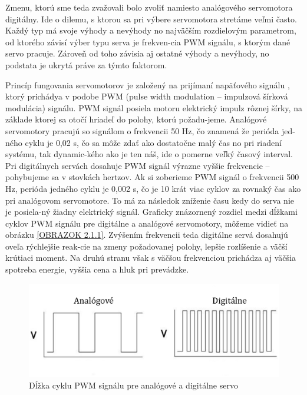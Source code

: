Zmenu, ktorú sme teda zvažovali bolo zvoliť namiesto analógového servomotora digitálny. Ide o dilemu, s ktorou sa pri výbere servomotora stretáme veľmi často. Každý typ má svoje výhody a nevýhody no najväčším rozdielovým parametrom, od ktorého závisí výber typu serva je frekven-cia PWM signálu, s ktorým dané servo pracuje. Zároveň od toho závisia aj ostatné výhody a nevýhody, no podstata je ukrytá práve za týmto faktorom.

Princíp fungovania servomotorov je založený na prijímaní napäťového signálu , ktorý prichádya v podobe PWM (pulse width modulation – impulzová šírková modulácia) signálu. PWM signál posiela motoru elektrický impulz rôznej šírky, na základe ktorej sa otočí hriadeľ do polohy, ktorú požadu-jeme. Analógové servomotory pracujú so signálom o frekvencii 50 Hz, čo znamená že perióda jed-ného cyklu je 0,02 s, čo sa môže zdať ako dostatočne malý čas no pri riadení systému, tak dynamic-kého ako je ten náš, ide o pomerne veľký časový interval. Pri digitálnych servách dosahuje PWM signál výrazne vyššie frekvencie – pohybujeme sa v stovkách hertzov. Ak si zoberieme PWM signál o frekvencii 500 Hz, perióda jedného cyklu je 0,002 s, čo je 10 krát viac cyklov za rovnaký čas ako pri analógovom servomotore. To má za následok zníženie času kedy do serva nie je posiela-ný žiadny elektrický signál. Graficky znázornený rozdiel medzi dĺžkami cyklov PWM signálu pre digitálne a analógové servomotory, môžeme vidieť na obrázku \ref{OBRAZOK 2.1.1}. Zvýšením frekvencii teda digitálne servá dosahujú oveľa rýchlejšie reak-cie na zmeny požadovanej polohy, lepšie rozlíšenie a väčší krútiaci moment. Na druhú stranu však s väčšou frekvenciou prichádza aj väčšia spotreba energie,  vyššia cena a hluk pri prevádzke.
 
 \begin{figure}[]
 	\centering
 	\includegraphics[width=160mm]{obr/PWMsignal.eps}
 	\caption{Dĺžka cyklu PWM signálu pre analógové a digitálne servo}\label{OBRAZOK 2.2.1} 
 \end{figure} 
 
